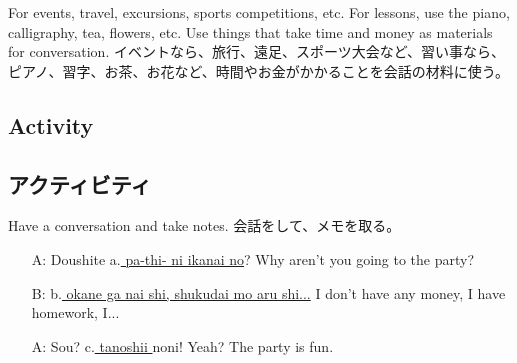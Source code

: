 \documentclass[uplatex,dvipdfmx,b5paper,english,10pt]{jsbook}
\begin{document}
\begin{toianswer}
\ifEnglish
For events, travel, excursions, sports competitions, etc. For lessons, use the piano, calligraphy, tea, flowers, etc. Use things that take time and money as materials for conversation.
\else
イベントなら、旅行、遠足、スポーツ大会など、習い事なら、ピアノ、習字、お茶、お花など、時間やお金がかかることを会話の材料に使う。
\fi
\end{toianswer}


\ifEnglish
\subsection{Activity}
\else
\subsection{アクティビティ}
\fi

\begin{toiquestion}
\ifEnglish
Have a conversation and take notes.
\else
会話をして、メモを取る。
\fi
\end{toiquestion}

\begin{itemize}
  \item[A:] Doushite a.\underline{ pa-thi- ni ikanai no}?              {\tiny\hfill Why aren't you going to the party?}
  \item[B:] b.\underline{ okane ga nai shi, shukudai mo aru shi...}   {\tiny\hfill I don't have any money, I have homework, I...}
  \item[A:] Sou? c.\underline{ tanoshii } noni!                       {\tiny\hfill Yeah? The party is fun.}
\end{itemize}
\end{document}

